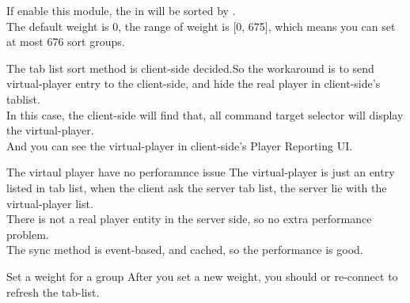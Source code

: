 
If enable this module, the  in  will be sorted by .
\\
The default weight is 0, the range of weight is [0, 675], which means you can set at most 676 sort groups.

The tab list sort method is client-side decided.So the workaround is to send virtual-player entry to the client-side, and hide the real player in client-side's tablist.
\\
In this case, the client-side will find that, all command target selector will display the virtual-player.
\\
And you can see the virtual-player in client-side's Player Reporting UI.

\begin{note}{The virtaul player have no perforamnce issue}
    The virtual-player is just an entry listed in tab list, when the client ask the server tab list, the server lie with the virtual-player list.
    \\
    There is not a real player entity in the server side, so no extra performance problem.
    \\
    The sync method is event-based, and cached, so the performance is good.
\end{note}

\begin{example}{Set a weight for a group}
    After you set a new weight, you should  or re-connect to refresh the tab-list.
\end{example}



